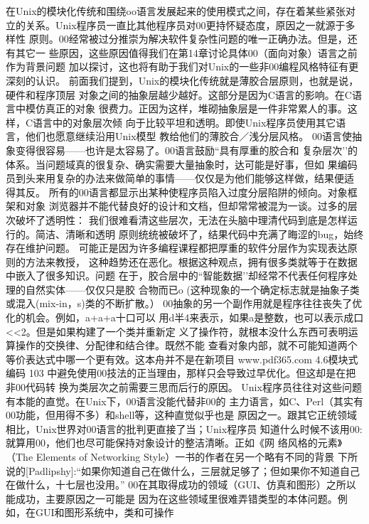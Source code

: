 \documentclass[11pt,oneside]{book}
\begin{document}
\begin{common-format}
在Unix的模块化传统和围绕oo语言发展起来的使用模式之间，存在着某些紧张对
立的关系。Unix程序员一直比其他程序员对00更持怀疑态度，原因之一就源于多样性
原则。00经常被过分推崇为解决软件复杂性问题的唯一正确办法。但是，还有其它一
些原因，这些原因值得我们在第14章讨论具体00（面向对象）语言之前作为背景问题
加以探讨，这也将有助于我们对Unix的一些非00编程风格特征有更深刻的认识。
    前面我们提到，Unix的模块化传统就是薄胶合层原则，也就是说，硬件和程序顶层
对象之间的抽象层越少越好。这部分是因为C语言的影响。在C语言中模仿真正的对象
很费力。正因为这样，堆砌抽象层是一件非常累人的事。这样，C语言中的对象层次倾
向于比较平坦和透明。即使Unix程序员使用其它语言，他们也愿意继续沿用Unix模型
教给他们的薄胶合／浅分层风格。
    00语言使抽象变得很容易——也许是太容易了。00语言鼓励“具有厚重的胶合和
复杂层次’’的体系。当问题域真的很复杂、确实需要大量抽象时，达可能是好事，但如
果编码员到头来用复杂的办法来做简单的事情——仅仅是为他们能够这样做，结果便适
得其反。
    所有的00语言都显示出某种使程序员陷入过度分层陷阱的倾向。对象框架和对象
浏览器并不能代替良好的设计和文档，但却常常被混为一谈。过多的层次破坏了透明性：
我们很难看清这些层次，无法在头脑中理清代码到底是怎样运行的。简洁、清晰和透明
原则统统被破坏了，结果代码中充满了晦涩的bug，始终存在维护问题。
    可能正是因为许多编程课程都把厚重的软件分层作为实现表达原则的方法来教授，
这种趋势还在恶化。根据这种观点，拥有很多类就等于在数据中嵌入了很多知识。问题
在于，胶合层中的“智能数据’’却经常不代表任何程序处理的自然实体——仅仅只是胶
合物而已o  (这种现象的一个确定标志就是抽象子类或混入(mix-in，s)类的不断扩散。）
    00抽象的另一个副作用就是程序往往丧失了优化的机会。例如，a+a+a十口可以
用d半4来表示，如果a是整数，也可以表示成口<<2。但是如果构建了一个类并重新定
义了操作符，就根本没什么东西可表明运算操作的交换律、分配律和结合律。既然不能
查看对象内部，就不可能知道两个等价表达式中哪一个更有效。这本舟并不是在新项目
www.pdf365.com
4.6模块式编码
103
中避免使用00技法的正当理由，那样只会导致过早优化。但这却是在把非00代码转
换为类层次之前需要三思而后行的原因。
    Unix程序员往往对这些问题有本能的直觉。在Unix下，00语言没能代替非00的
主力语言，如C、Perl（其实有00功能，但用得不多）和shell等，这种直觉似乎也是
原因之一。跟其它正统领域相比，Unix世界对00语言的批判更直接了当；Unix程序员
知道什么时候不该用00:就算用00，他们也尽可能保持对象设计的整洁清晰。正如《网
络风格的元素》（The Elements of Networking Style）一书的作者在另一个略有不同的背景
下所说的[Padlipshy]:“如果你知道自己在做什么，三层就足够了；但如果你不知道自己
在做什么，十七层也没用。”
    00在其取得成功的领域（GUI、仿真和图形）之所以能成功，主要原因之一可能是
因为在这些领域里很难弄错类型的本体问题。例如，在GUI和图形系统中，类和可操作

\end{common-format}
\end{document}

